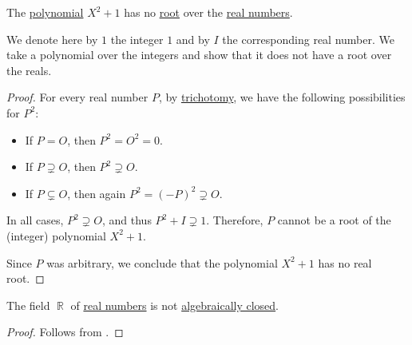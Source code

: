 \begin{proposition}\label{thm:x2_plus_one_no_root}
  The \hyperref[def:polynomial_algebra/polynomials]{polynomial} \( X^2 + 1 \) has no \hyperref[def:polynomial_root]{root} over the \hyperref[def:real_numbers]{real numbers}.
\end{proposition}
\begin{comments}
  \item We denote here by \( 1 \) the integer \( 1 \) and by \( I \) the corresponding real number. We take a polynomial over the integers and show that it does not have a root over the reals.
\end{comments}
\begin{proof}
  For every real number \( P \), by \hyperref[def:binary_relation/trichotomy]{trichotomy}, we have the following possibilities for \( P^2 \):
  \begin{itemize}
    \item If \( P = O \), then \( P^2 = O^2 = 0 \).
    \item If \( P \supsetneq O \), then \( P^2 \supsetneq O \).
    \item If \( P \subsetneq O \), then again \( P^2 = (-P)^2 \supsetneq O \).
  \end{itemize}

  In all cases, \( P^2 \supsetneq O \), and thus \( P^2 + I \supsetneq 1 \). Therefore, \( P \) cannot be a root of the (integer) polynomial \( X^2 + 1 \).

  Since \( P \) was arbitrary, we conclude that the polynomial \( X^2 + 1 \) has no real root.
\end{proof}

\begin{proposition}\label{thm:reals_not_algebraically_closed}
  The field \( \BbbR \) of \hyperref[def:real_numbers]{real numbers} is not \hyperref[def:algebraically_closed_field]{algebraically closed}.
\end{proposition}
\begin{proof}
  Follows from .
\end{proof}
